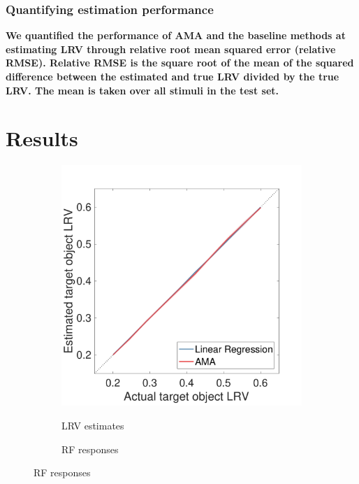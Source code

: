 \documentclass{jov}
\providecommand{\DIFaddtex}[1]{{\bf #1}} %
\providecommand{\DIFaddbegin}{} %
\providecommand{\DIFaddend}{} %
\providecommand{\DIFadd}[1]{\texorpdfstring{\DIFaddtex{#1}}{#1}} %
\newcommand{\DIFaddincludegraphics}[2][]{{\color{blue}\fbox{\DIFOincludegraphics[#1]{#2}}}} %
\DeclareRobustCommand{\DIFaddbegin}{\DIFOaddbegin \let\includegraphics\DIFaddincludegraphics} %
\DeclareRobustCommand{\DIFaddend}{\DIFOaddend \let\includegraphics\DIFOincludegraphics} %
\begin{document}
\DIFaddbegin \subsubsection*{\DIFadd{Quantifying estimation performance}}
\DIFadd{We quantified the performance of AMA and the baseline methods at estimating LRV through relative root mean squared error (relative RMSE). Relative RMSE is the square root of the mean of the squared difference between the estimated and true LRV divided by the true LRV. The mean is taken over all stimuli in the test set. 
}

\DIFaddend \section{Results} \label{Results}
\begin{figure}
\centering
            \begin{subfigure}[b]{0.3 \textwidth}
        \caption{LRV estimates}
        \includegraphics[width=\textwidth, trim={0 0 0 1.3cm},clip]{../FiguresDraft5/Figure10/Figure10_a.pdf}
        \label{fig:case1Estimates}
    \end{subfigure} 
        \begin{subfigure}[b]{0.31 \textwidth}
        \caption{RF responses}

\end{subfigure}
\end{figure}
\end{document}
